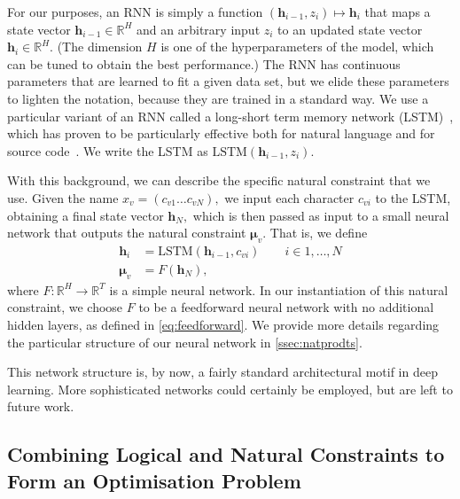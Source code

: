 \documentclass[acmsmall, review, anonymous]{acmart}\settopmatter{printfolios=true,printccs=false,printacmref=false}
\newcommand{\margincomment}[2]{\marginpar{\scriptsize\color{Maroon}#1 says: #2}}
\newcommand{\ivp}[1]{\margincomment{IVP}{#1}}
\begin{document}
For our purposes, an RNN is simply a function $(\bm{h}_{i-1}, z_i) \mapsto \bm{h}_{i}$
that maps a state vector $\bm{h}_{i-1} \in \mathbb{R}^H$
and an arbitrary input $z_i$ to an updated state vector $\bm{h}_{i}  \in \mathbb{R}^H$.
(The dimension $H$ is one of the hyperparameters of the model, which can be tuned
to obtain the best performance.)
The RNN has continuous parameters that are learned to fit a given data set,
but we elide these parameters to lighten the notation, because they are trained in a standard way.
We use a particular variant of an RNN called a
long-short term memory network (LSTM)~\cite{hochreiter97},
which has proven to be particularly effective both for natural language
and for source code~\cite{sundermeyer2012,melis17,white2015,dam16}.
We write the LSTM as $\text{LSTM}(\bm{h}_{i-1}, z_i)$.

With this background, we can describe the specific natural constraint that we use.
Given the name $x_v = (c_{v1} \ldots c_{vN}),$ we input each character $c_{vi}$ to the LSTM,
obtaining a final state vector $\bm{h}_N,$ which is then passed as input to a small
neural network that outputs the natural constraint $\bm{\mu}_v$.
That is, we define
\begin{subequations}\label{eq:lstm}
	\begin{align}
		\bm{h}_i   & = \text{LSTM}(\bm{h}_{i-1}, c_{vi}) \qquad i \in 1, \ldots, N \\
		\bm{\mu}_v & = F(\bm{h}_N), \label{eq:lstmb}
	\end{align}
\end{subequations}
where $F: \mathbb{R}^H \rightarrow \mathbb{R}^T$ is a simple neural network.
In our instantiation of this natural constraint, we choose $F$ to be a feedforward neural network with
no additional hidden layers, as defined in \eqref{eq:feedforward}.
We provide more details regarding the particular structure of our neural network in \cref{ssec:natprodts}.

This network structure is, by now, a fairly standard architectural motif in deep learning.
More sophisticated networks could certainly be employed, but are left to future work.

\subsection{Combining Logical and Natural Constraints to Form an Optimisation
	Problem} \label{ssec:optimisation}
\end{document}
